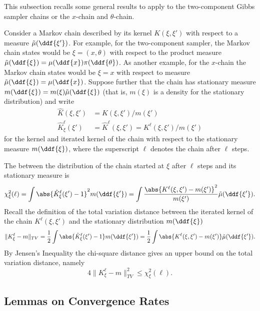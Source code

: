 \documentclass[12pt]{article}
\begin{document}
This subsection recalls some general results to apply to the
two-component Gibbs sampler chains or the \( x \)-chain and \( \theta \)-chain.

Consider a Markov chain described by its kernel \( K(\xi, \xi') \) with
respect to a measure \( \tilde{\mu}(\ddf{\xi'} ) \).  For example, for
the two-component sampler, the Markov chain states would be \( \xi = (x,
\theta ) \) with respect to the product measure \( \tilde{\mu}(\ddf {\xi}
) = \mu (\ddf{x})\pi(\ddf{\theta} ) \).  As another example, for the \(
x \)-chain the Markov chain states would be \( \xi = x \) with respect
to measure \( \tilde{\mu}(\ddf{\xi} ) = \mu(\ddf{x} ) \).  Suppose
further that the chain has stationary measure \( m(\ddf{\xi}) = m(\xi )
\tilde{\mu}(\ddf{\xi}) \) (that is, \( m (\xi) \) is a density for the
stationary distribution) and write
\begin{align*}
    \hat{K}(\xi, \xi') &= K(\xi,\xi')/m(\xi') \\
    \hat{K}_{\xi}^{\ell}(\xi') &= \hat{K}^{\ell}(\xi, \xi') = K^{\ell}(\xi,\xi')/m
    (\xi')
\end{align*}
for the kernel and iterated kernel of the chain with respect to the
stationary measure \( m(\ddf{\xi}) \), where the superscript \( \ell \)
denotes the chain after \( \ell \) steps.

The  between the distribution of the chain
started at \( \xi \) after \( \ell \) steps and its stationary measure
is
\[
    \chi^2_{\xi}(\ell) = \int \abs{ \hat{K}^{\ell}_{\xi}(\xi') -1}^ {2}
    m(\ddf{\xi'}) \\
    = \int \frac{\abs{K^{\ell}(\xi, \xi') - m(\xi')}^2}{m(\xi')} \tilde{\mu}
    (\ddf{\xi'}).
\] Recall the definition of the total variation distance between the
iterated kernel of the chain \( K^{\ell}(\xi, \xi') \) and the
stationary distribution \( m(\ddf{\xi}) \)
\[
    \| K^{\ell}_{\xi} - m \|_{TV} = \frac{1}{2} \int \abs{ \hat{K}^{\ell}_
    {\xi}(\xi') -1} m(\ddf{\xi'}) \\
    = \frac{1}{2} \int \abs{K^{\ell}(\xi, \xi') - m(\xi')} \tilde{\mu}(\ddf
    {\xi'}).
\] By Jensen's Inequality the chi-square distance gives an upper bound
on the total variation distance, namely
\[
    4 \| K^{\ell}_{\xi} - m \|_{TV}^2 \le \chi^2_{\xi}(\ell).
\]

\subsection*{Lemmas on Convergence Rates}
\end{document}
